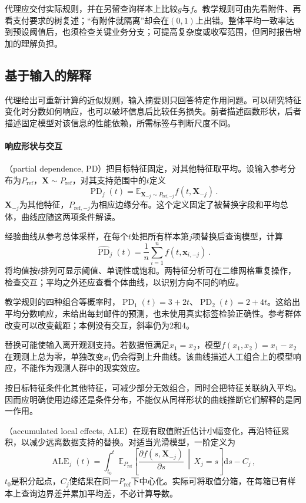 代理应交付实际规则，并在另留查询样本上比较$g$与$f$。教学规则可由先看附件、再看支付要求的树复述；“有附件就隔离”却会在$(0,1)$上出错。整体平均一致率达到预设阈值后，也须检查关键业务分支；可提高复杂度或收窄范围，但同时报告增加的理解负担。

\subsection{基于输入的解释}
\label{sec:interpretability-global-dependence}

代理给出可重新计算的近似规则，输入摘要则只回答特定作用问题。可以研究特征变化时分数如何响应，也可以破坏信息后比较任务损失。前者描述函数形状，后者描述固定模型对该信息的性能依赖，所需标签与判断尺度不同。

\paragraph{响应形状与交互}

（partial dependence, PD）把目标特征固定，对其他特征取平均。设输入参考分布为$P_{\mathrm{ref}}$，$\bm X\sim P_{\mathrm{ref}}$，对其支持范围中的$t$定义
\[
 \operatorname{PD}_j(t)
 =\mathbb E_{\bm X_{-j}\sim P_{\mathrm{ref},-j}}
 f(t,\bm X_{-j})\, .
\]
$\bm X_{-j}$为其他特征，$P_{\mathrm{ref},-j}$为相应边缘分布。这个定义固定了被替换字段和平均总体，曲线应随这两项条件解读。

经验曲线从参考总体采样，在每个$t$处把所有样本第$j$项替换后查询模型，计算
\[
 \widehat{\operatorname{PD}}_j(t)
 =\frac1n\sum_{i=1}^n f(t,\bm{x}_{i,-j})\, .
\]
将均值按$t$排列可显示阈值、单调性或饱和。两特征分析可在二维网格重复操作，检查交互；平均之外还应查看个体曲线，以识别方向不同的响应。

教学规则的四种组合等概率时，$\operatorname{PD}_1(t)=3+2t$、$\operatorname{PD}_2(t)=2+4t$。这给出平均分数响应，未给出每封邮件的预测，也未使用真实标签检验正确性。参考群体改变可以改变截距；本例没有交互，斜率仍为2和4。

替换可能使输入离开观测支持。若数据恒满足$x_1=x_2$，模型$f(x_1,x_2)=x_1-x_2$在观测上总为零，单独改变$x_1$仍会得到上升曲线。该曲线描述人工组合上的模型响应，不能作为观测人群中的现实效应。

按目标特征条件化其他特征，可减少部分无效组合，同时会把特征关联纳入平均。因而应明确使用边缘还是条件分布，不能仅从同样形状的曲线推断它们解释的是同一作用。

（accumulated local effects, ALE）在现有取值附近估计小幅变化，再沿特征累积，以减少远离数据支持的替换。对适当光滑模型，一阶定义为
\begin{equation}
 \operatorname{ALE}_j(t)
 =\int_{t_0}^{t}
 \mathbb E_{P_{\mathrm{ref}}}\!\left[
 \frac{\partial f(s,\bm X_{-j})}{\partial s}
 \,\middle|\,X_j=s\right]\mathrm ds-C_j\, ,
 \label{eq:interpretability-ale}
\end{equation}
$t_0$是积分起点，$C_j$使结果在同一$P_{\mathrm{ref}}$下中心化。实际可将取值分箱，在每箱已有样本上查询边界差并累加平均差，不必计算导数。


